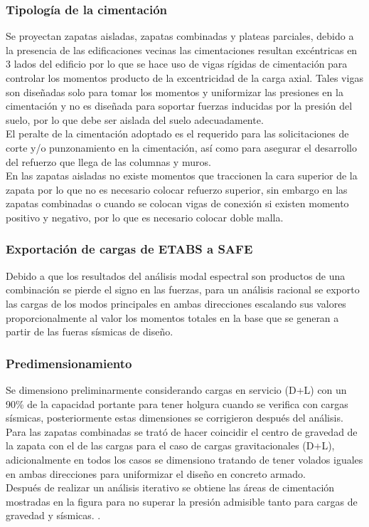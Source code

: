 \subsubsection{Tipología de la cimentación}
Se proyectan zapatas aisladas, zapatas combinadas y plateas parciales, debido a la presencia de las edificaciones vecinas las cimentaciones resultan excéntricas en 3 lados del edificio por lo que se hace uso de vigas rígidas de cimentación para controlar los momentos producto de la excentricidad de la carga axial. Tales vigas son diseñadas solo para tomar los momentos y uniformizar las presiones en la cimentación y no es diseñada para soportar fuerzas inducidas por la presión del suelo, por lo que debe ser aislada del suelo adecuadamente.\\
El peralte de la cimentación adoptado es el requerido para las solicitaciones de corte y/o punzonamiento en la cimentación, así como para asegurar el desarrollo del refuerzo que llega de las columnas y muros.\\
En las zapatas aisladas no existe momentos que traccionen la cara superior de la zapata por lo que no es necesario colocar refuerzo superior, sin embargo en las zapatas combinadas o cuando se colocan vigas de conexión si existen momento positivo y negativo, por lo que es necesario colocar doble malla.

\subsubsection{Exportación de cargas de ETABS a SAFE}
Debido a que los resultados del análisis modal espectral son productos de una combinación se pierde el signo en las fuerzas, para un análisis racional se exporto las cargas de los modos principales en ambas direcciones escalando sus valores proporcionalmente al valor los momentos totales en la base que se generan a partir de las fueras sísmicas de diseño.

\subsubsection{Predimensionamiento}

Se dimensiono preliminarmente considerando cargas en servicio (D+L) con un 90\% de la capacidad portante para tener holgura cuando se verifica con cargas sísmicas, posteriormente estas dimensiones se corrigieron después del análisis.\\
Para las zapatas combinadas se trató de hacer coincidir el centro de gravedad de la zapata con el de las cargas para el caso de cargas gravitacionales (D+L), adicionalmente en todos los casos se dimensiono tratando de tener volados iguales en ambas direcciones para uniformizar el diseño en concreto armado.\\
Después de realizar un análisis iterativo se obtiene las áreas de cimentación mostradas en la figura  para no superar la presión admisible tanto para cargas de gravedad y sísmicas. .

